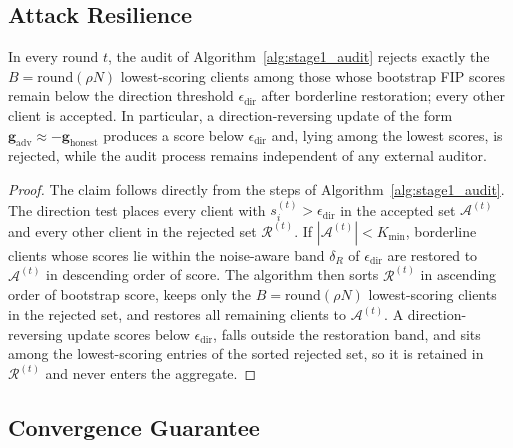 \subsection{Attack Resilience}

\begin{theorem}
\label{thm:fip-security}
In every round $t$, the audit of Algorithm~\ref{alg:stage1_audit} rejects exactly the $B=\mathrm{round}(\rho N)$ lowest-scoring clients among those whose bootstrap FIP scores remain below the direction threshold $\epsilon_{\mathrm{dir}}$ after borderline restoration; every other client is accepted. In particular, a direction-reversing update of the form $\mathbf{g}_{\text{adv}}\approx-\mathbf{g}_{\text{honest}}$ produces a score below $\epsilon_{\mathrm{dir}}$ and, lying among the lowest scores, is rejected, while the audit process remains independent of any external auditor.
\end{theorem}

\begin{proof}
The claim follows directly from the steps of Algorithm~\ref{alg:stage1_audit}. The direction test places every client with $s_i^{(t)}>\epsilon_{\mathrm{dir}}$ in the accepted set $\mathcal{A}^{(t)}$ and every other client in the rejected set $\mathcal{R}^{(t)}$. If $|\mathcal{A}^{(t)}|<K_{\min}$, borderline clients whose scores lie within the noise-aware band $\delta_R$ of $\epsilon_{\mathrm{dir}}$ are restored to $\mathcal{A}^{(t)}$ in descending order of score. The algorithm then sorts $\mathcal{R}^{(t)}$ in ascending order of bootstrap score, keeps only the $B=\mathrm{round}(\rho N)$ lowest-scoring clients in the rejected set, and restores all remaining clients to $\mathcal{A}^{(t)}$. A direction-reversing update scores below $\epsilon_{\mathrm{dir}}$, falls outside the restoration band, and sits among the lowest-scoring entries of the sorted rejected set, so it is retained in $\mathcal{R}^{(t)}$ and never enters the aggregate.
\end{proof}

\subsection{Convergence Guarantee}

